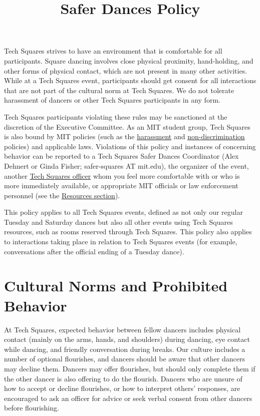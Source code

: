 \documentclass{article}
\title{Safer Dances Policy}
\date{}
\begin{document}
\maketitle

Tech Squares strives to have an environment that is comfortable for all participants. Square dancing involves close physical proximity, hand-holding, and other forms of physical contact, which are not present in many other activities. While at a Tech Squares event, participants should get consent for all interactions that are not part of the cultural norm at Tech Squares. We do not tolerate harassment of dancers or other Tech Squares participants in any form.

Tech Squares participants violating these rules may be sanctioned at the discretion of the Executive Committee. As an MIT student group, Tech Squares is also bound by MIT policies (such as the \href{http://handbook.mit.edu/harassment}{harassment} and \href{http://web.mit.edu/referencepubs/nondiscrimination/}{non-discrimination} policies) and applicable laws. Violations of this policy and instances of concerning behavior can be reported to a Tech Squares Safer Dances Coordinator (Alex Dehnert or Ginda Fisher; safer-squares AT mit.edu), the organizer of the event, another \href{http://www.mit.edu/\~{}tech-squares/officers.html}{Tech Squares officer} whom you feel more comfortable with or who is more immediately available, or appropriate MIT officials or law enforcement personnel (see the \hyperref[sec:resources]{Resources section}).

This policy applies to all Tech Squares events, defined as not only our regular Tuesday and Saturday dances but also all other events using Tech Squares resources, such as rooms reserved through Tech Squares. This policy also applies to interactions taking place in relation to Tech Squares events (for example, conversations after the official ending of a Tuesday dance).

\section{Cultural Norms and Prohibited Behavior}

At Tech Squares, expected behavior between fellow dancers includes physical contact (mainly on the arms, hands, and shoulders) during dancing, eye contact while dancing, and friendly conversation during breaks. Our culture includes a number of optional flourishes, and dancers should be aware that other dancers may decline them. Dancers may offer flourishes, but should only complete them if the other dancer is also offering to do the flourish. Dancers who are unsure of how to accept or decline flourishes, or how to interpret others' responses, are encouraged to ask an officer for advice or seek verbal consent from other dancers before flourishing.
\end{document}
